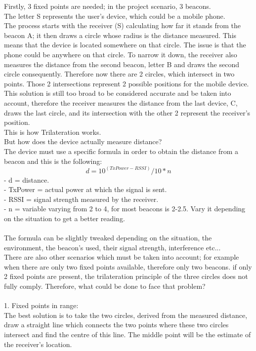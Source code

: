 Firstly, 3 fixed points are needed; in the project scenario, 3 beacons.\\
The letter S represents the user's device, which could be a mobile phone.\\
The process starts with the receiver (S) calculating how far it stands from the beacon A; it then draws a circle whose radius is the distance measured. This means that the device is located somewhere on that circle. The issue is that the phone could be anywhere on that circle. To narrow it down, the receiver also measures the distance from the second beacon, letter B and draws the second circle consequently. Therefore now there are 2 circles, which intersect in two points. Those 2 intersections represent 2 possible positions for the mobile device. This solution is still too broad to be considered accurate and be taken into account, therefore the receiver measures the distance from the last device, C, draws the last circle, and its intersection with the other 2 represent the receiver's position.\\ 
This is how Trilateration works.\\
But how does the device actually measure distance?\\
The device must use a specific formula in order to obtain the distance from a beacon and this is the following: 
\begin{equation}
d = 10^(TxPower - RSSI)/10*n
\end{equation}
- d = distance.\\
- TxPower = actual power at which the signal is sent.\\
- RSSI = signal strength measured by the receiver.\\
- n = variable varying from 2 to 4, for most beacons is 2-2.5. Vary it depending on the situation to get a better reading.\\
\\
The formula can be slightly tweaked depending on the situation, the environment, the beacon's used, their signal strength, interference etc...\\
There are also other scenarios which must be taken into account; for example when there are only two fixed points available, therefore only two beacons. if only 2 fixed points are present, the trilateration principle of the three circles does not fully comply. Therefore, what could be done to face that problem?\\
\\

1. Fixed points in range: \\
The best solution is to take the two circles, derived from the measured distance, draw a straight line which connects the two points where these two circles intersect and find the centre of this line. The middle point will be the estimate of the receiver's location.\\\\

